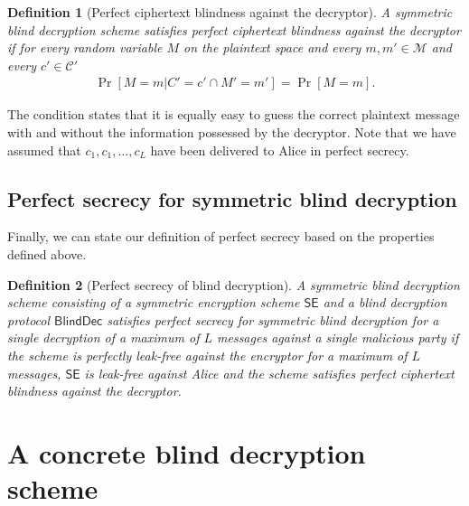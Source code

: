 \documentclass[10pt,journal]{IEEEtran}
\newcommand{\alg}[1]{\mathsf{#1}}
\newcommand{\sch}[1]{\mathsf{#1}}
\newtheorem{definition}{Definition}[section]
\begin{document}
\begin{definition}[Perfect ciphertext blindness against the decryptor]
\label{def:Perfect ciphertext blindness against decryptor}
A symmetric blind decryption
scheme
satisfies \emph{perfect ciphertext blindness against the decryptor}
if for every random variable $M$ on the plaintext space
and every $m,m' \in \mathcal{M}$ and every $c' \in \mathcal{C'}$
\begin{eqnarray}
\Pr \left[ M = m \left| C' = c' \cap M' = m' \right. \right] 
= \Pr \left[ M = m \right]. \nonumber
\end{eqnarray}
\end{definition}
The condition states that it is equally easy to guess the correct plaintext message with
and without the information possessed by the decryptor. Note that we have
assumed that $c_1,c_1,\ldots,c_L$ have been delivered to Alice in perfect secrecy.



\subsection{Perfect secrecy for symmetric blind decryption}

Finally, we can state our definition of perfect secrecy based on the properties defined above.
\begin{definition}[Perfect secrecy of blind decryption]
\label{def:Perfect secrecy of blind decryption}
A symmetric blind decryption
scheme consisting of a symmetric encryption scheme $\sch{SE}$ and a blind decryption protocol $\alg{BlindDec}$
satisfies perfect secrecy for symmetric blind decryption
for a single decryption of a maximum of $L$ messages
against a single malicious party
if the scheme is perfectly leak-free against the encryptor for a maximum of $L$ messages,
$\sch{SE}$ is leak-free against Alice 
and the scheme satisfies perfect ciphertext blindness against the decryptor.
\end{definition}

\section{A concrete blind decryption scheme}
\label{sec:Perfectly secure encryption}
\end{document}
